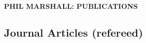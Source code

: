 
\begin{center}
{\bf \Large P{\large HIL} M{\large ARSHALL}: P{\large UBLICATIONS}}
\end{center}

\small

\subsection*{Journal Articles (refereed)}

